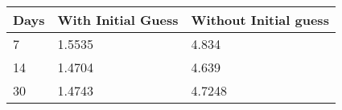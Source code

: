 \begin{tabular}{lll}
Days & With Initial Guess & Without Initial guess \\ 
\hline 
7 & 1.5535 & 4.834 \\ 
14 & 1.4704 & 4.639 \\ 
30 & 1.4743 & 4.7248 \\ 
\hline 
\end{tabular}